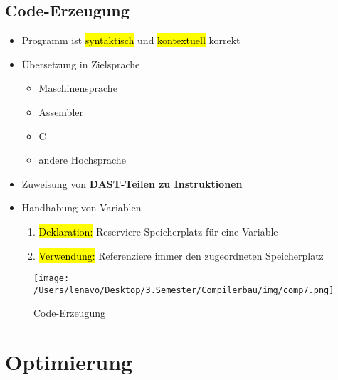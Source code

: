 \documentclass[a4paper, 10pt]{article}
\begin{document}
\subsection{Code-Erzeugung}
\begin{itemize}
    \item Programm ist \hl{syntaktisch} und \hl{kontextuell} korrekt
    \item Übersetzung in Zielsprache
    \begin{itemize}
        \item Maschinensprache
        \item Assembler
        \item C
        \item andere Hochsprache
    \end{itemize}
    \item Zuweisung von \textbf{DAST-Teilen zu Instruktionen}
    \item Handhabung von Variablen
    \begin{enumerate}
        \item \hl{Deklaration:} Reserviere Speicherplatz für eine Variable
        \item \hl{Verwendung:} Referenziere immer den zugeordneten Speicherplatz
    \end{enumerate}
\end{itemize}
\begin{figure}[h]
    \centering
    \texttt{[image: /Users/lenavo/Desktop/3.Semester/Compilerbau/img/comp7.png]}
    \caption{Code-Erzeugung}
    \label{fig:enter-label}
\end{figure}
\section{Optimierung}
\end{document}
